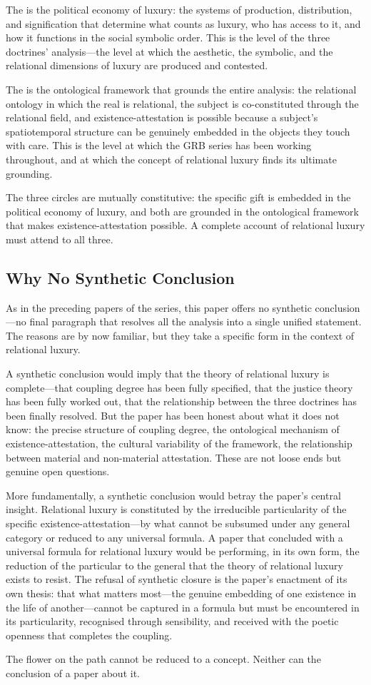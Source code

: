 The  is the political economy of luxury: the systems of production, distribution, and signification that determine what counts as luxury, who has access to it, and how it functions in the social symbolic order. This is the level of the three doctrines' analysis---the level at which the aesthetic, the symbolic, and the relational dimensions of luxury are produced and contested.

The  is the ontological framework that grounds the entire analysis: the relational ontology in which the real is relational, the subject is co-constituted through the relational field, and existence-attestation is possible because a subject's spatiotemporal structure can be genuinely embedded in the objects they touch with care. This is the level at which the GRB series has been working throughout, and at which the concept of relational luxury finds its ultimate grounding.

The three circles are mutually constitutive: the specific gift is embedded in the political economy of luxury, and both are grounded in the ontological framework that makes existence-attestation possible. A complete account of relational luxury must attend to all three.

\subsection{Why No Synthetic Conclusion}
\label{p16:subsec:no_synthesis}

\noindent
As in the preceding papers of the series, this paper offers no synthetic conclusion---no final paragraph that resolves all the analysis into a single unified statement. The reasons are by now familiar, but they take a specific form in the context of relational luxury.

A synthetic conclusion would imply that the theory of relational luxury is complete---that coupling degree has been fully specified, that the justice theory has been fully worked out, that the relationship between the three doctrines has been finally resolved. But the paper has been honest about what it does not know: the precise structure of coupling degree, the ontological mechanism of existence-attestation, the cultural variability of the framework, the relationship between material and non-material attestation. These are not loose ends but genuine open questions.

More fundamentally, a synthetic conclusion would betray the paper's central insight. Relational luxury is constituted by the irreducible particularity of the specific existence-attestation---by what cannot be subsumed under any general category or reduced to any universal formula. A paper that concluded with a universal formula for relational luxury would be performing, in its own form, the reduction of the particular to the general that the theory of relational luxury exists to resist. The refusal of synthetic closure is the paper's enactment of its own thesis: that what matters most---the genuine embedding of one existence in the life of another---cannot be captured in a formula but must be encountered in its particularity, recognised through sensibility, and received with the poetic openness that completes the coupling.

The flower on the path cannot be reduced to a concept. Neither can the conclusion of a paper about it.
